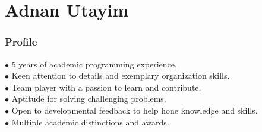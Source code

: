 \documentclass{tccv}
\begin{document}
\part{Adnan Utayim}



\section{Profile}
$\bullet$ 5 years of academic programming experience. \\
$\bullet$ Keen attention to details and exemplary organization skills.\\
$\bullet$ Team player with a passion to learn and contribute.\\
$\bullet$ Aptitude for solving challenging problems.\\
$\bullet$ Open to developmental feedback to help hone knowledge and skills. \\
$\bullet$ Multiple academic distinctions and awards.
\end{document}
